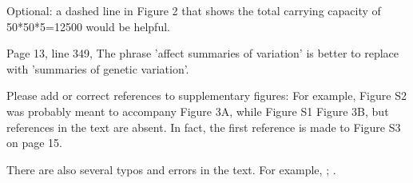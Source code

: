 \begin{point}{}
    Optional: a dashed line in Figure 2 that shows the total carrying capacity of 50*50*5=12500 would be helpful.
\end{point}


\begin{point}{}
    Page 13, line 349, The phrase 'affect summaries of variation' is better to replace with 'summaries of genetic variation'.
\end{point}


\begin{point}{}
    Please add or correct references to supplementary figures: For example, Figure S2 was probably meant to accompany Figure 3A, while Figure S1 Figure 3B, but references in the text are absent. In fact, the first reference is made to Figure S3 on page 15.
\end{point}



\begin{point}{}
    There are also several typos and errors in the text. For example, \revref; .
\end{point}






